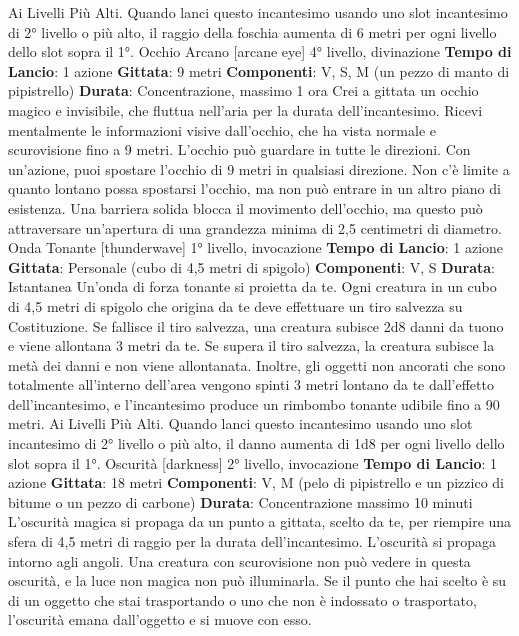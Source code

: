 \begin{multicols}{2}
Ai Livelli Più Alti. Quando lanci questo incantesimo
usando uno slot incantesimo di 2° livello o più alto, il
raggio della foschia aumenta di 6 metri per ogni livello
dello slot sopra il 1°.
Occhio Arcano
[arcane eye]
4° livello, divinazione
\textbf{Tempo di Lancio}: 1 azione
\textbf{Gittata}: 9 metri
\textbf{Componenti}: V, S, M (un pezzo di manto di pipistrello)
\textbf{Durata}: Concentrazione, massimo 1 ora
Crei a gittata un occhio magico e invisibile, che fluttua
nell’aria per la durata dell’incantesimo.
Ricevi mentalmente le informazioni visive dall’occhio,
che ha vista normale e scurovisione fino a 9 metri.
L’occhio può guardare in tutte le direzioni.
Con un’azione, puoi spostare l’occhio di 9 metri in
qualsiasi direzione. Non c’è limite a quanto lontano
possa spostarsi l’occhio, ma non può entrare in un altro
piano di esistenza. Una barriera solida blocca il
movimento dell’occhio, ma questo può attraversare
un’apertura di una grandezza minima di 2,5 centimetri
di diametro.
Onda Tonante
[thunderwave]
1° livello, invocazione
\textbf{Tempo di Lancio}: 1 azione
\textbf{Gittata}: Personale (cubo di 4,5 metri di spigolo)
\textbf{Componenti}: V, S
\textbf{Durata}: Istantanea
Un’onda di forza tonante si proietta da te. Ogni creatura
in un cubo di 4,5 metri di spigolo che origina da te deve
effettuare un tiro salvezza su Costituzione. Se fallisce il
tiro salvezza, una creatura subisce 2d8 danni da tuono
e viene allontana 3 metri da te. Se supera il tiro
salvezza, la creatura subisce la metà dei danni e non
viene allontanata.
Inoltre, gli oggetti non ancorati che sono totalmente
all’interno dell’area vengono spinti 3 metri lontano da te
dall’effetto dell’incantesimo, e l’incantesimo produce un
rimbombo tonante udibile fino a 90 metri.
Ai Livelli Più Alti. Quando lanci questo incantesimo
usando uno slot incantesimo di 2° livello o più alto, il
danno aumenta di 1d8 per ogni livello dello slot sopra il
1°.
Oscurità
[darkness]
2° livello, invocazione
\textbf{Tempo di Lancio}: 1 azione
\textbf{Gittata}: 18 metri
\textbf{Componenti}: V, M (pelo di pipistrello e un pizzico di
bitume o un pezzo di carbone)
\textbf{Durata}: Concentrazione massimo 10 minuti
L’oscurità magica si propaga da un punto a gittata,
scelto da te, per riempire una sfera di 4,5 metri di raggio
per la durata dell’incantesimo. L’oscurità si propaga
intorno agli angoli. Una creatura con scurovisione non
può vedere in questa oscurità, e la luce non magica non
può illuminarla.
Se il punto che hai scelto è su di un oggetto che stai
trasportando o uno che non è indossato o trasportato,
l’oscurità emana dall’oggetto e si muove con esso.

\end{multicols}

